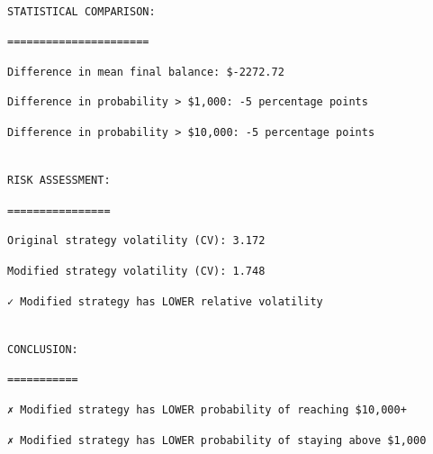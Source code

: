 \documentclass[
  letterpaper,
  DIV=11,
  numbers=noendperiod]{scrartcl}
\begin{document}
\begin{verbatim}

STATISTICAL COMPARISON:
\end{verbatim}

\begin{verbatim}
======================
\end{verbatim}

\begin{verbatim}
Difference in mean final balance: $-2272.72
\end{verbatim}

\begin{verbatim}
Difference in probability > $1,000: -5 percentage points
\end{verbatim}

\begin{verbatim}
Difference in probability > $10,000: -5 percentage points
\end{verbatim}

\begin{verbatim}

RISK ASSESSMENT:
\end{verbatim}

\begin{verbatim}
================
\end{verbatim}

\begin{verbatim}
Original strategy volatility (CV): 3.172
\end{verbatim}

\begin{verbatim}
Modified strategy volatility (CV): 1.748
\end{verbatim}

\begin{verbatim}
✓ Modified strategy has LOWER relative volatility
\end{verbatim}

\begin{verbatim}

CONCLUSION:
\end{verbatim}

\begin{verbatim}
===========
\end{verbatim}

\begin{verbatim}
✗ Modified strategy has LOWER probability of reaching $10,000+
\end{verbatim}

\begin{verbatim}
✗ Modified strategy has LOWER probability of staying above $1,000
\end{verbatim}
\end{document}
